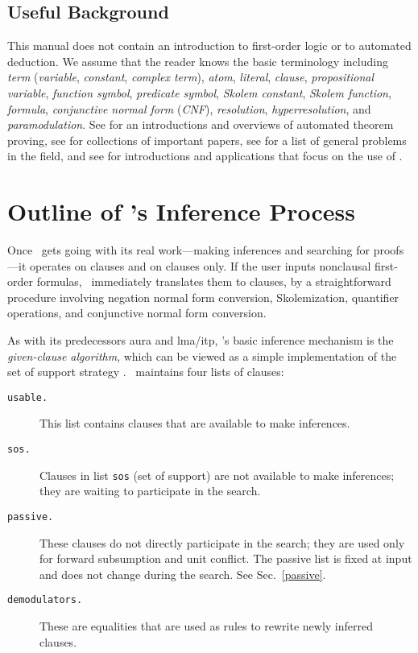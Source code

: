 \documentclass[11pt]{article}
\begin{document}
\subsection{Useful Background}

This manual does not contain an introduction to first-order logic
or to automated deduction.
We assume that the reader knows the basic terminology
including {\it term}
({\it variable}, {\it constant}, {\it complex term}), {\it atom},
{\it literal}, {\it clause}, {\it propositional variable}, {\it function
symbol}, {\it predicate symbol}, {\it Skolem constant}, {\it Skolem
function}, {\it formula}, {\it conjunctive normal form}
({\it CNF}), {\it resolution}, {\it hyperresolution}, and
{\it paramodulation}.
See \cite{chang-lee,loveland,JAR-overview}
for an introductions and overviews of automated theorem proving,
see \cite{siekmann-wrightson,after-25-years}
for collections of important papers, see
\cite{book2} for a list of general problems in the field, and
see \cite{fascinating,kalman-otter,wm-rp:monograph}
for introductions and applications that focus on the use
of \otter.

\section{Outline of \otter's Inference Process} \label{outline}

Once \otter\ gets going with its real work---making
inferences and searching for proofs---it operates on clauses and on
clauses only.  If the user inputs nonclausal first-order formulas,
\otter\ immediately translates them to clauses, by a straightforward
procedure involving negation normal form conversion, Skolemization,
quantifier operations, and conjunctive normal form conversion.

As with its predecessors {\sc aura} and {\sc lma/itp}, \otter's basic
inference mechanism is the {\em given-clause algorithm}, which can be
viewed as a simple implementation of the set of support strategy
\cite{book1a}.  \otter\ maintains four lists of clauses:
\begin{description}
\item[{\tt usable.}]
This list contains clauses that are available to make inferences.
\item[{\tt sos.}]
Clauses in list \verb:sos: (set of support) are not available to make
inferences; they are waiting to participate in the search.
\item[{\tt passive.}]
These clauses do not directly participate in the search; they are used
only for forward subsumption and unit conflict.  The passive list
is fixed at input and does not change during the search.
See Sec.~\ref{passive}.
\item[{\tt demodulators.}]
These are equalities that are used as rules to rewrite newly inferred
clauses.
\end{description}
\end{document}
